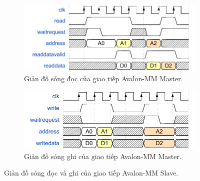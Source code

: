\begin{itemize}
    \begin{figure}[htbp]
        \centering
        \begin{subfigure}[b]{0.7\textwidth}
            \centering
            \includegraphics[width=\linewidth]{Images/02_05_AvalonMaster_ReadWaveform.pdf}
            \caption{Giản đồ sóng đọc của giao tiếp Avalon-MM Master.}
            \label{fig:02_05_avalon_master_read}
        \end{subfigure}
        \vfill
        \begin{subfigure}[b]{0.7\textwidth}
            \centering
            \includegraphics[width=\linewidth]{Images/02_06_AvalonMaster_WriteWaveform.pdf}
            \caption{Giản đồ sóng ghi của giao tiếp Avalon-MM Master.}
            \label{fig:02_06_avalon_master_write}
        \end{subfigure}
        \caption{Giản đồ sóng đọc và ghi của giao tiếp Avalon-MM Slave.}
        \label{fig:avalon_master_waveforms}
    \end{figure}




\end{itemize}
